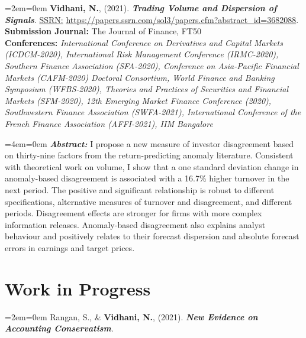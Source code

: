 \documentclass[11pt,a4paper,]{moderncv}
\begin{document}
%
  \par%
  \medskip
  \leftskip=2em\rightskip=0em%
  \noindent\ignorespaces
\leavevmode\hypertarget{ref-disagreement_volume}{}
\textbf{Vidhani, N.}, (2021). \textbf{\textit{Trading Volume and Dispersion of Signals}}. \underline{SSRN:} \url{https://papers.ssrn.com/sol3/papers.cfm?abstract_id=3682088}.\\
\textbf{Submission Journal:} The Journal of Finance, FT50\\
\textbf{Conferences:} \textit{International Conference on Derivatives and Capital Markets (ICDCM-2020), International Risk Management Conference (IRMC-2020), Southern Finance Association (SFA-2020), Conference on Asia-Pacific Financial Markets (CAFM-2020) Doctoral Consortium, World Finance and Banking Symposium (WFBS-2020), Theories and Practices of Securities and Financial Markets (SFM-2020), 12th Emerging Market Finance Conference (2020), Southwestern Finance Association (SWFA-2021), International Conference of the French Finance Association (AFFI-2021), IIM Bangalore}
%
  \par\medskip

%
  \par%
  \medskip
  \leftskip=4em\rightskip=0em%
  \noindent\ignorespaces
\textbf{\textit{Abstract:}} I propose a new measure of investor disagreement based on thirty-nine factors from the return-predicting anomaly literature. Consistent with theoretical work on volume, I show that a one standard deviation change in anomaly-based disagreement is associated with a 16.7\% higher turnover in the next period. The positive and significant relationship is robust to different specifications, alternative measures of turnover and disagreement, and different periods. Disagreement effects are stronger for firms with more complex information releases. Anomaly-based disagreement also explains analyst behaviour and positively relates to their forecast dispersion and absolute forecast errors in earnings and target prices.
%
  \par\medskip

\endgroup

\hypertarget{work-in-progress}{%
\section{Work in Progress}\label{work-in-progress}}

\begingroup
\setlength{\parindent}{-0.5in}
\setlength{\leftskip}{0.5in}

%
  \par%
  \medskip
  \leftskip=2em\rightskip=0em%
  \noindent\ignorespaces
\leavevmode\hypertarget{ref-conservatism}{}
Rangan, S., \& \textbf{Vidhani, N.}, (2021). \textbf{\textit{New Evidence on Accounting Conservatism}}.
%
  \par\medskip
\end{document}
